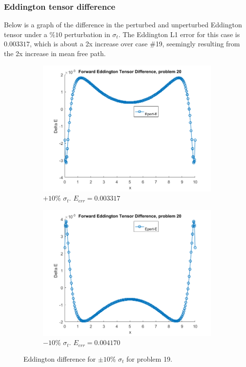 \documentclass{article}
\begin{document}
\subsubsection{Eddington tensor difference}
Below is a graph of the difference in the perturbed and unperturbed Eddington tensor under a $\% 10$ perturbation in $\sigma_t$. The Eddington L1 error for this case is $0.003317$, which is about a 2x increase over case $\#$19, seemingly resulting from the 2x increase in mean free path.
\begin{figure}[H]
\centering
\begin{subfigure}{.5\textwidth}
  \centering
  \includegraphics[width=1\linewidth]{p20deltaE.png}
  \caption{$+10\%$ $\sigma_t$. $E_{err}=0.003317$}
  \label{fig:sub1}
\end{subfigure}%
\begin{subfigure}{.5\textwidth}
  \centering
  \includegraphics[width=1\linewidth]{p20deltaEdst-10.png}
  \caption{$-10\%$ $\sigma_t$. $E_{err}=0.004170$}
  \label{fig:sub2}
\end{subfigure}
\caption{Eddington difference for $\pm10\%$ $\sigma_t$ for problem 19.}
\label{fig:test}
\end{figure}
\end{document}
